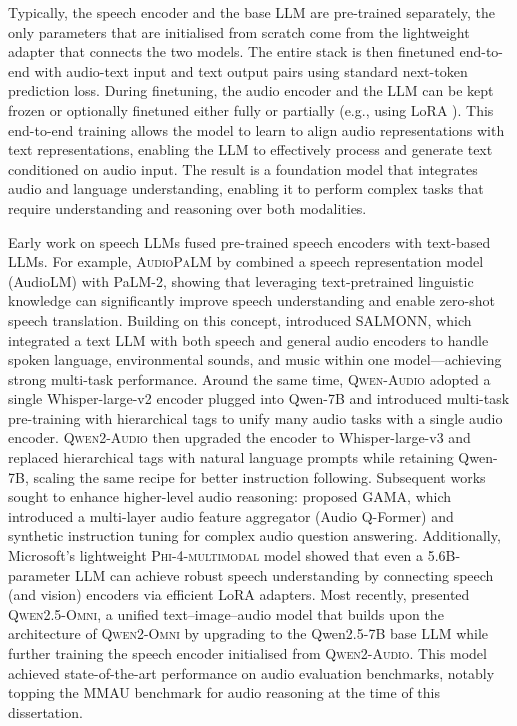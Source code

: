 \documentclass{report}
\begin{document}
Typically, the speech encoder and the base LLM are pre-trained separately, the only parameters that are initialised from scratch come from the lightweight adapter that connects the two models. The entire stack is then finetuned end-to-end with audio-text input and text output pairs using standard next-token prediction loss. During finetuning, the audio encoder and the LLM can be kept frozen or optionally finetuned either fully or partially (e.g., using LoRA \citep{hu2021loralowrankadaptationlarge}). This end-to-end training allows the model to learn to align audio representations with text representations, enabling the LLM to effectively process and generate text conditioned on audio input. The result is a foundation model that integrates audio and language understanding, enabling it to perform complex tasks that require understanding and reasoning over both modalities.

Early work on speech LLMs fused pre-trained speech encoders with text-based LLMs. For example, \textsc{AudioPaLM} by \citet{rubenstein2023audiopalmlargelanguagemodel} combined a speech representation model (AudioLM) with PaLM-2, showing that leveraging text-pretrained linguistic knowledge can significantly improve speech understanding and enable zero-shot speech translation. Building on this concept, \citet{tang2024salmonngenerichearingabilities} introduced \textsc{SALMONN}, which integrated a text LLM with both speech and general audio encoders to handle spoken language, environmental sounds, and music within one model—achieving strong multi-task performance. Around the same time, \textsc{Qwen-Audio} \citep{chu2023qwenaudioadvancinguniversalaudio} adopted a single Whisper-large-v2 encoder plugged into Qwen-7B and introduced multi-task pre-training with hierarchical tags to unify many audio tasks with a single audio encoder. \textsc{Qwen2-Audio} \citep{chu2024qwen2audiotechnicalreport} then upgraded the encoder to Whisper-large-v3 and replaced hierarchical tags with natural language prompts while retaining Qwen-7B, scaling the same recipe for better instruction following. Subsequent works sought to enhance higher-level audio reasoning: \citet{ghosh2024gamalargeaudiolanguagemodel} proposed \textsc{GAMA}, which introduced a multi-layer audio feature aggregator (Audio Q-Former) and synthetic instruction tuning for complex audio question answering. Additionally, Microsoft’s lightweight \textsc{Phi-4-multimodal} model \citep{microsoft2025phi4minitechnicalreportcompact} showed that even a 5.6B-parameter LLM can achieve robust speech understanding by connecting speech (and vision) encoders via efficient LoRA adapters. Most recently, \citet{xu2025qwen25omnitechnicalreport} presented \textsc{Qwen2.5-Omni}, a unified text–image–audio model that builds upon the architecture of \textsc{Qwen2-Omni} by upgrading to the Qwen2.5-7B base LLM while further training the speech encoder initialised from \textsc{Qwen2-Audio}. This model achieved state-of-the-art performance on audio evaluation benchmarks, notably topping the \textsc{MMAU} benchmark \citep{sakshi2024mmaumassivemultitaskaudio} for audio reasoning at the time of this dissertation.
\end{document}
